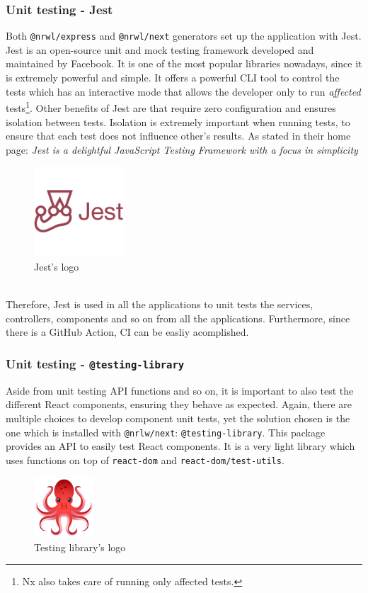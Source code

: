 \documentclass[a4paper, 12pt, oneside]{book}
\begin{document}
\subsubsection{Unit testing - Jest}
Both \texttt{@nrwl/express} and \texttt{@nrwl/next} generators set up the application with Jest. Jest is an open-source unit and mock testing framework developed and maintained by Facebook. It is one of the most popular libraries nowadays, since it is extremely powerful and simple. It offers a powerful CLI tool to control the tests which has an interactive mode that allows the developer only to run \emph{affected} tests\footnote{Nx also takes care of running only affected tests.}. Other benefits of Jest are that require zero configuration and ensures isolation between tests. Isolation is extremely important when running tests, to ensure that each test does not influence other's results. As stated in their home page: \emph{Jest is a delightful JavaScript Testing Framework with a focus in simplicity}
\\
\begin{figure}[h!]
	\centering
	\includegraphics[width=0.3\textwidth]{assets/jest-logo.png}
	\caption{Jest's logo}
\end{figure}
\\
Therefore, Jest is used in all the applications to unit tests the services, controllers, components and so on from all the applications. Furthermore, since there is a GitHub Action, CI can be easliy acomplished.
\subsubsection{Unit testing - \texttt{@testing-library}}
Aside from unit testing API functions and so on, it is important to also test the different React components, ensuring they behave as expected. Again, there are multiple choices to develop component unit tests, yet the solution chosen is the one which is installed with \texttt{@nrlw/next}: \texttt{@testing-library}. This package provides an API to easily test React components. It is a very light library which uses functions on top of \texttt{react-dom} and \texttt{react-dom/test-utils}.
\\
\begin{figure}[h!]
	\centering
	\includegraphics[width=0.2\textwidth]{assets/testing-library-logo.png}
	\caption{Testing library's logo}
\end{figure}
\end{document}
